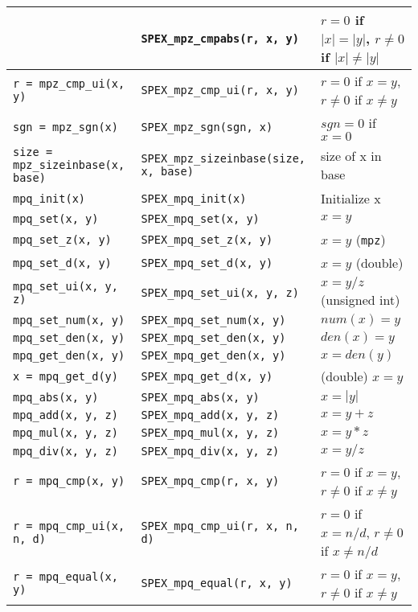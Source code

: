 \documentclass[12pt]{report}
\theoremstyle{definition}
\begin{document}
{\begin{center}
\begin{tabular}{|l|l|l|}
    & \verb|SPEX_mpz_cmpabs(r, x, y)|
    & $r = 0$ if $|x|=|y|$,  $r\neq 0$  if $|x|\neq |y|$\\ \hline
\verb|r = mpz_cmp_ui(x, y)|
    & \verb|SPEX_mpz_cmp_ui(r, x, y)|
    & $r = 0$ if $x=y$,  $r\neq 0$  if $x\neq y$ \\ \hline
\verb|sgn = mpz_sgn(x)|
    & \verb|SPEX_mpz_sgn(sgn, x)|
    & $sgn = 0$ if $x = 0$ \\ \hline
\verb|size = mpz_sizeinbase(x, base)|
    & \verb|SPEX_mpz_sizeinbase(size, x, base)|
    & size of x in base \\ \hline
\verb|mpq_init(x)|
    & \verb|SPEX_mpq_init(x)|
    & Initialize x \\ \hline
\verb|mpq_set(x, y)|
    & \verb|SPEX_mpq_set(x, y)|
    & $x = y$ \\ \hline
\verb|mpq_set_z(x, y)|
    & \verb|SPEX_mpq_set_z(x, y)|
    & $x = y$ (\verb|mpz|) \\ \hline
\verb|mpq_set_d(x, y)|
    & \verb|SPEX_mpq_set_d(x, y)|
    & $x=y$ (double) \\ \hline
\verb|mpq_set_ui(x, y, z)|
    & \verb|SPEX_mpq_set_ui(x, y, z)|
    & $x = y/z$ (unsigned int) \\ \hline
\verb|mpq_set_num(x, y)|
    & \verb|SPEX_mpq_set_num(x, y)|
    & $num(x) = y$ \\ \hline
\verb|mpq_set_den(x, y)|
    & \verb|SPEX_mpq_set_den(x, y)|
    & $den(x) = y$ \\ \hline
\verb|mpq_get_den(x, y)|
    & \verb|SPEX_mpq_get_den(x, y)|
    & $x = den(y)$ \\ \hline
\verb|x = mpq_get_d(y)|
    & \verb|SPEX_mpq_get_d(x, y)|
    & (double) $x = y$ \\ \hline
\verb|mpq_abs(x, y)|
    & \verb|SPEX_mpq_abs(x, y)|
    & $x = |y|$ \\ \hline
\verb|mpq_add(x, y, z)|
    & \verb|SPEX_mpq_add(x, y, z)|
    & $x = y+z$ \\ \hline
\verb|mpq_mul(x, y, z)|
    & \verb|SPEX_mpq_mul(x, y, z)|
    & $x = y*z$ \\ \hline
\verb|mpq_div(x, y, z)|
    & \verb|SPEX_mpq_div(x, y, z)|
    & $x = y/z$ \\ \hline
\verb|r = mpq_cmp(x, y)|
    & \verb|SPEX_mpq_cmp(r, x, y)|
    & $r = 0$ if $x=y$,  $r\neq 0$ if $x\neq y$ \\ \hline
\verb|r = mpq_cmp_ui(x, n, d)|
    & \verb|SPEX_mpq_cmp_ui(r, x, n, d)|
    & $r = 0$ if $x=n/d$, $r\neq 0$ if $x\neq n/d$ \\ \hline
\verb|r = mpq_equal(x, y)|
    & \verb|SPEX_mpq_equal(r, x, y)|
    & $r = 0$ if $x=y$,  $r\neq 0$ if $x\neq y$ \\ \hline
\end{tabular}
\end{center}
}
\end{document}
